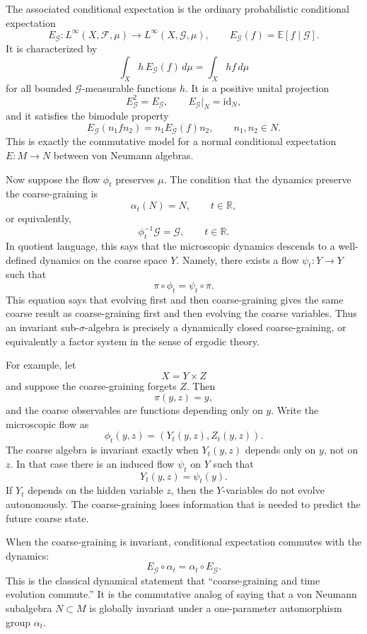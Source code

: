 \documentclass[a4paper,11pt]{article}
\theoremstyle{definition}
\begin{document}
The associated conditional expectation is the ordinary probabilistic conditional expectation
\[
E_{\mathcal G}:L^\infty(X,\mathcal F,\mu)\to L^\infty(X,\mathcal G,\mu),
\qquad
E_{\mathcal G}(f)=\mathbb E[f\mid \mathcal G].
\]
It is characterized by
\[
\int_X h\,E_{\mathcal G}(f)\,d\mu
=
\int_X h f\,d\mu
\]
for all bounded \(\mathcal G\)-measurable functions \(h\). It is a positive unital projection
\[
E_{\mathcal G}^2=E_{\mathcal G},
\qquad
E_{\mathcal G}|_N=\mathrm{id}_N,
\]
and it satisfies the bimodule property
\[
E_{\mathcal G}(n_1 f n_2)=n_1E_{\mathcal G}(f)n_2,
\qquad n_1,n_2\in N.
\]
This is exactly the commutative model for a normal conditional expectation \(E:M\to N\) between von Neumann algebras.

Now suppose the flow \(\phi_t\) preserves \(\mu\). The condition that the dynamics preserve the coarse-graining is
\[
\alpha_t(N)=N,
\qquad t\in\mathbb R,
\]
or equivalently,
\[
\phi_t^{-1}\mathcal G=\mathcal G,
\qquad t\in\mathbb R.
\]
In quotient language, this says that the microscopic dynamics descends to a well-defined dynamics on the coarse space \(Y\). Namely, there exists a flow \(\psi_t:Y\to Y\) such that
\[
\pi\circ \phi_t=\psi_t\circ \pi.
\]
This equation says that evolving first and then coarse-graining gives the same coarse result as coarse-graining first and then evolving the coarse variables. Thus an invariant sub-\(\sigma\)-algebra is precisely a dynamically closed coarse-graining, or equivalently a factor system in the sense of ergodic theory.

For example, let
\[
X=Y\times Z
\]
and suppose the coarse-graining forgets \(Z\). Then
\[
\pi(y,z)=y,
\]
and the coarse observables are functions depending only on \(y\). Write the microscopic flow as
\[
\phi_t(y,z)=(Y_t(y,z),Z_t(y,z)).
\]
The coarse algebra is invariant exactly when \(Y_t(y,z)\) depends only on \(y\), not on \(z\). In that case there is an induced flow \(\psi_t\) on \(Y\) such that
\[
Y_t(y,z)=\psi_t(y).
\]
If \(Y_t\) depends on the hidden variable \(z\), then the \(Y\)-variables do not evolve autonomously. The coarse-graining loses information that is needed to predict the future coarse state.

When the coarse-graining is invariant, conditional expectation commutes with the dynamics:
\[
E_{\mathcal G}\circ \alpha_t
=
\alpha_t\circ E_{\mathcal G}.
\]
This is the classical dynamical statement that ``coarse-graining and time evolution commute.'' It is the commutative analog of saying that a von Neumann subalgebra \(N\subset M\) is globally invariant under a one-parameter automorphism group \(\alpha_t\).
\end{document}
